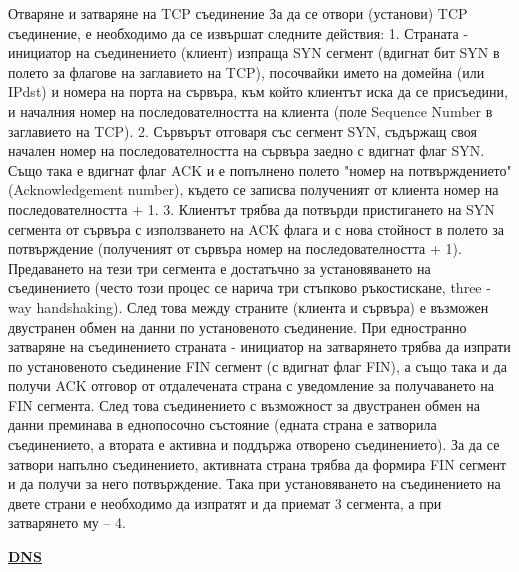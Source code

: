 \documentclass{article}
\begin{document}
Отваряне и затваряне на TCP съединение \newline
За да се отвори (установи) TCP съединение, е необходимо да се извършат следните действия:
1. Страната - инициатор на съединението (клиент) изпраща SYN сегмент (вдигнат бит SYN в полето за флагове на заглавието на TCP),
посочвайки името на домейна (или IPdst) и номера на порта на сървъра, към който клиентът иска да се присъедини, и началния номер
на последователността на клиента (поле Sequence Number в заглавието на TCP).
2. Сървърът отговаря със сегмент SYN, съдържащ своя начален номер на последователността на сървъра заедно с вдигнат флаг SYN.
Също така е вдигнат флаг ACK и е попълнено полето "номер на потвърждението" (Acknowledgement number), където се записва
полученият от клиента номер на последователността + 1.
3. Клиентът трябва да потвърди пристигането на SYN сегмента от сървъра с използването на ACK флага и с нова стойност в полето
за потвърждение (полученият от сървъра номер на последователността + 1). Предаването на тези три сегмента е достатъчно за
установяването на съединението (често този процес се нарича три стъпково ръкостискане, three - way handshaking). След това между
страните (клиента и сървъра) е възможен двустранен обмен на данни по установеното съединение.
При едностранно затваряне на съединението страната - инициатор на затварянето трябва да изпрати по установеното съединение FIN
сегмент (с вдигнат флаг FIN), а също така и да получи ACK отговор от отдалечената страна с уведомление за получаването на FIN
сегмента. След това съединението с възможност за двустранен обмен на данни преминава в еднопосочно състояние (едната страна е
затворила съединението, а втората е активна и поддържа отворено съединението). За да се затвори напълно съединението, активната
страна трябва да формира FIN сегмент и да получи за него потвърждение. Така при установяването на съединението на двете страни
е необходимо да изпратят и да приемат 3 сегмента, а при затварянето му – 4.

\textbf{\underline{DNS}}
\end{document}
